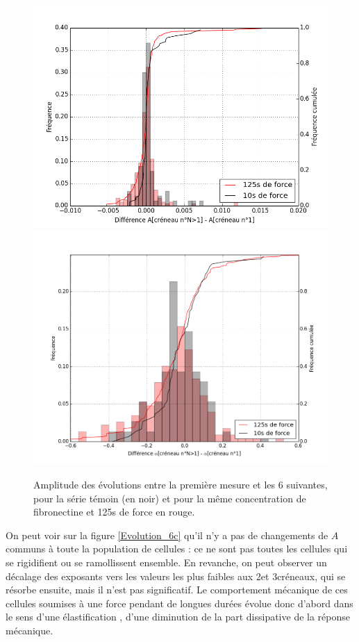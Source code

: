 \begin{figure}
\includegraphics[scale=0.3]{Figures/A_diff.png} 
\includegraphics[scale=0.3]{Figures/E_diff.png}
\caption{Amplitude des évolutions entre la première mesure et les 6 suivantes, pour la série  témoin (en noir) et pour la même concentration de fibronectine et 125s de force en rouge.}
\label{Diff}

 
\end{figure}
On peut voir sur la figure \ref{Evolution_6c} qu'il n'y a pas de changements de $A$ communs à toute la population de cellules : ce ne sont pas toutes les cellules qui se rigidifient ou se ramollissent ensemble. 
En revanche, on peut observer un décalage des exposants vers les valeurs les plus faibles aux 2\ieme  et 3\ieme créneaux, qui se résorbe ensuite, mais il n'est pas significatif. 
Le comportement mécanique de ces cellules soumises à une force pendant de longues durées évolue donc d'abord dans le sens d'une \og élastification \fg , d'une diminution de la part dissipative de la réponse mécanique. 

